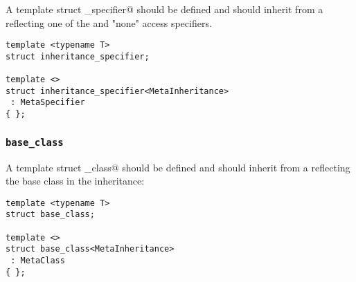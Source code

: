 A template struct \verb@inheritance_specifier@ should be defined and should inherit from
a  reflecting one of the \verb@virtual@ and "none" access specifiers.

\begin{verbatim}
template <typename T>
struct inheritance_specifier;

template <>
struct inheritance_specifier<MetaInheritance>
 : MetaSpecifier
{ };
\end{verbatim}

\subsubsection{\texttt{base\_class}}

A template struct \verb@base_class@ should be defined and should inherit from
a  reflecting the base class in the inheritance:

\begin{verbatim}
template <typename T>
struct base_class;

template <>
struct base_class<MetaInheritance>
 : MetaClass
{ };
\end{verbatim}


